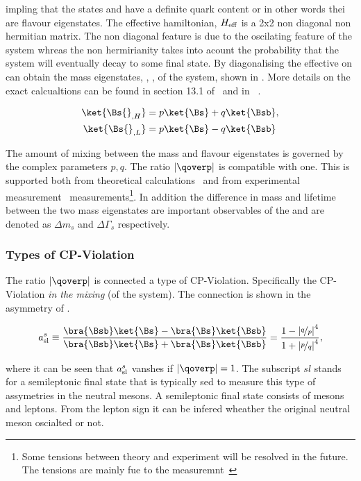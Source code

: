 \noindent impling that the states \Bs and \Bsb have a definite quark content or in other words
thei are flavour eigenstates. The effective hamiltonian, $H_{\rm eff}$ is a 2x2 non diagonal non hermitian matrix.
The non diagonal feature is due to the oscilating feature of the \BBbarSyst system whreas the non
hermirianity takes into acount the probability that the system will eventually decay to some final state.
By diagonalising the effective on can obtain the mass eigenstates, , , of the system, shown in .
More details on the exact calcualtions can be found in section 13.1 of~\cite{PDG} and in ~\cite{jeroenThesis,DeBruyn-thesis}.

\begin{align}
\ket{\Bs{}_{,H}} &= p \ket{\Bs} + q \ket{\Bsb}, \nonumber \\
\ket{\Bs{}_{,L}} &= p \ket{\Bs} - q \ket{\Bsb}
\label{bs_mass_eigen}
\end{align}

The amount of mixing between the mass and flavour eigenstates is governed by the complex parameters $p,q$.
The ratio $|\qoverp|$ is compatible with one. This is supported both from theoretical calculations~\cite{Lenz:2011ti}
and from experimental measurement~\cite{asl-paper} measurements\footnote{Some tensions between theory and experiment will be resolved in the future. The tensions are
mainly fue to the \dzero measuremnt~\cite{Abazov:2013uma}}. In addition the difference in mass and lifetime between the two
mass eigenstates are important observables of the \BBbarSyst and are denoted as $\Delta m_s$ and $\Delta\Gamma_s$ respectively.

\subsubsection{Types of CP-Violation}
The ratio $|\qoverp|$ is connected a type of CP-Violation. Specifically the CP-Violation {\it in the mixing} (of the \BBbarSyst system).
The connection is shown in the asymmetry of .

\begin{equation}
a_{\rm sl}^{s}  \equiv \frac{\bra{\Bsb}\ket{\Bs} - \bra{\Bs}\ket{\Bsb}} {\bra{\Bsb}\ket{\Bs} + \bra{\Bs}\ket{\Bsb}}
                     = \frac{1 - \left|\nicefrac{q}{p}\right|^4}{1 + \left|\nicefrac{p}{q}\right|^4},
\label{acp_mixing}
\end{equation}

\noindent where it can be seen that $a_{\rm sl}^{s}$ vanshes if $|\qoverp|= 1$. The subscript $sl$ stands for a semileptonic
final state that is typically sed to measure this type of assymetries in the neutral mesons. A semileptonic final state
consists of mesons and leptons. From the lepton sign it can be infered wheather the original neutral meson oscialted or not.

